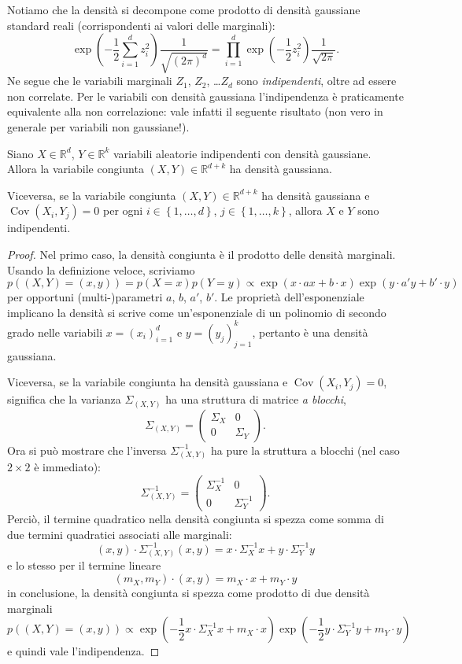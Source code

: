 \documentclass[
  italian,
  letterpaper,
]{book}
\newcommand{\bra}[1]{\left( #1 \right)}
\newcommand{\cur}[1]{\left\{ #1 \right\}}
\newcommand{\R}{\mathbb{R}}
\newcommand{\Cov}[1]{\operatorname{Cov}\bra{#1}}
\theoremstyle{definition}
\theoremstyle{remark}
\begin{document}
Notiamo che la densità si decompone come prodotto di densità gaussiane
standard reali (corrispondenti ai valori delle marginali):
\[ \exp\bra{ - \frac1 2 \sum_{i=1}^d z_i^2 }  \frac{1}{\sqrt{ (2 \pi)^d}} = \prod_{i=1}^d  \exp\bra{ - \frac1 2 z_i^2 }  \frac{1}{\sqrt{ 2 \pi}}.\]
Ne segue che le variabili marginali \(Z_1\), \(Z_2\), \ldots \(Z_d\)
sono \emph{indipendenti}, oltre ad essere non correlate. Per le
variabili con densità gaussiana l'indipendenza è praticamente
equivalente alla non correlazione: vale infatti il seguente risultato
(non vero in generale per variabili non gaussiane!).

Siano \(X \in \R^d\), \(Y \in \R^k\) variabili aleatorie indipendenti
con densità gaussiane. Allora la variabile congiunta
\((X,Y) \in \R^{d+k}\) ha densità gaussiana.

Viceversa, se la variabile congiunta \((X,Y) \in \R^{d+k}\) ha densità
gaussiana e \(\Cov{X_i,Y_j} = 0\) per ogni \(i\in \cur{1, \ldots, d}\),
\(j \in \cur{1, \ldots, k}\), allora \(X\) e \(Y\) sono indipendenti.

\begin{proof}
Nel primo caso, la densità congiunta è il prodotto delle densità
marginali. Usando la definizione veloce, scriviamo
\[p( (X,Y)=(x,y)) = p(X=x) p(Y=y) \propto \exp\bra{ x\cdot ax + b \cdot x} \exp\bra{ y \cdot a' y + b' \cdot y}\]
per opportuni (multi-)parametri \(a\), \(b\), \(a'\), \(b'\). Le
proprietà dell'esponenziale implicano la densità si scrive come
un'esponenziale di un polinomio di secondo grado nelle variabili
\(x=(x_i)_{i=1}^d\) e \(y=(y_j)_{j=1}^k\), pertanto è una densità
gaussiana.

Viceversa, se la variabile congiunta ha densità gaussiana e
\(\Cov{X_i, Y_j} = 0\), significa che la varianza \(\Sigma_{(X,Y)}\) ha
una struttura di matrice \emph{a blocchi},
\[ \Sigma_{(X,Y)} = \bra{ \begin{array}{cc} \Sigma_X & 0 \\ 0 & \Sigma_Y \end{array}}.\]
Ora si può mostrare che l'inversa \(\Sigma_{(X,Y)}^{-1}\) ha pure la
struttura a blocchi (nel caso \(2\times 2\) è immediato):
\[ \Sigma_{(X,Y)}^{-1} = \bra{ \begin{array}{cc} \Sigma_X^{-1} & 0 \\ 0 & \Sigma_Y^{-1} \end{array}}.\]
Perciò, il termine quadratico nella densità congiunta si spezza come
somma di due termini quadratici associati alle marginali:
\[ (x,y) \cdot \Sigma_{(X,Y)}^{-1}(x,y)  = x \cdot \Sigma_X^{-1} x + y \cdot \Sigma_Y ^{-1} y\]
e lo stesso per il termine lineare
\[ (m_X, m_Y) \cdot (x,y) = m_X \cdot x + m_Y \cdot y\] in conclusione,
la densità congiunta si spezza come prodotto di due densità marginali
\[ p( (X,Y)=(x,y)) \propto \exp\bra{ -\frac 1 2  x \cdot \Sigma_X^{-1} x  + m_X \cdot x} \exp\bra{ -\frac 1 2  y \cdot \Sigma_Y^{-1} y  + m_Y \cdot y} \]
e quindi vale l'indipendenza.
\end{proof}
\end{document}
